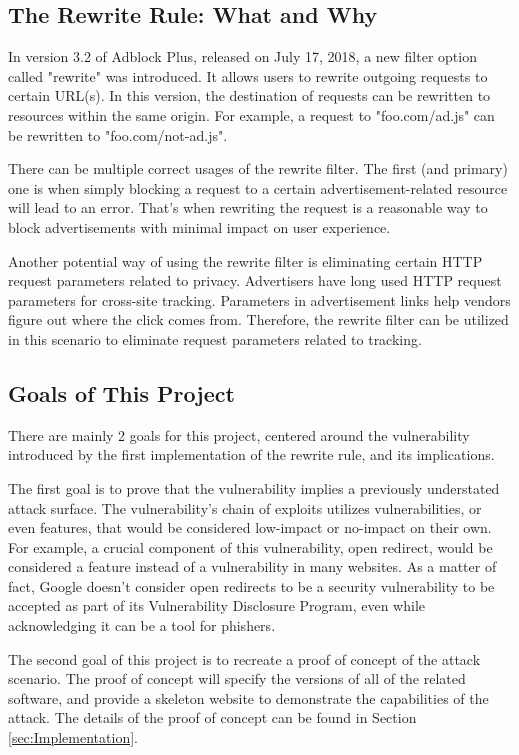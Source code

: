\documentclass[conference]{IEEEtran}
\begin{document}
\subsection{The Rewrite Rule: What and Why}
In version 3.2 of Adblock Plus, released on July 17, 2018, a new filter option called "rewrite" was introduced. It allows users to rewrite outgoing requests to certain URL(s). In this version, the destination of requests can be rewritten to resources within the same origin. For example, a request to "foo.com/ad.js" can be rewritten to "foo.com/not-ad.js".

There can be multiple correct usages of the rewrite filter. The first (and primary) one is when simply blocking a request to a certain advertisement-related resource will lead to an error. That's when rewriting the request is a reasonable way to block advertisements with minimal impact on user experience.

Another potential way of using the rewrite filter is eliminating certain HTTP request parameters related to privacy. Advertisers have long used HTTP request parameters for cross-site tracking. Parameters in advertisement links help vendors figure out where the click comes from. Therefore, the rewrite filter can be utilized in this scenario to eliminate request parameters related to tracking.

\subsection{Goals of This Project}
There are mainly 2 goals for this project, centered around the vulnerability introduced by the first implementation of the rewrite rule, and its implications.

The first goal is to prove that the vulnerability implies a previously understated attack surface. The vulnerability's chain of exploits utilizes vulnerabilities, or even features, that would be considered low-impact or no-impact on their own. For example, a crucial component of this vulnerability, open redirect, would be considered a feature instead of a vulnerability in many websites. As a matter of fact, Google doesn't consider open redirects to be a security vulnerability to be accepted as part of its Vulnerability Disclosure Program, even while acknowledging it can be a tool for phishers.\cite{noauthor_open_nodate}

The second goal of this project is to recreate a proof of concept of the attack scenario. The proof of concept will specify the versions of all of the related software, and provide a skeleton website to demonstrate the capabilities of the attack. The details of the proof of concept can be found in Section \ref{sec:Implementation}.
\end{document}
